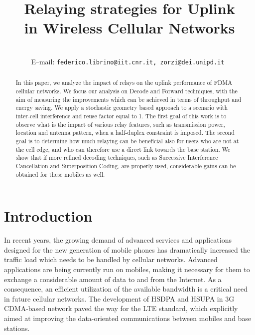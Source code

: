 \documentclass[12pt, letterpaper, onecolumn, draftcls]{IEEEtran}
\begin{document}
\sloppy
\title{Relaying strategies for Uplink\\ in Wireless Cellular Networks}


\author{\\
E--mail: \texttt{federico.librino@iit.cnr.it, zorzi@dei.unipd.it \vspace{-2mm}}
}

\date{}
\maketitle




\begin{abstract}
In this paper, we analyze the impact of relays on the uplink performance of FDMA cellular networks. We focus our analysis on Decode and Forward techniques, with the aim of measuring the improvements which can be achieved in terms of throughput and energy saving. We apply a stochastic geometry based approach to a scenario with inter-cell interference and reuse factor equal to 1.
The first goal of this work is to observe what is the impact of various relay features, such as transmission power, location and antenna pattern, when a half-duplex constraint is imposed.
The second goal is to determine how much relaying can be beneficial also for users who are not at the cell edge, and who can therefore use a direct link towards the base station. We show that if more refined decoding techniques, such as Successive Interference Cancellation and Superposition Coding, are properly used, considerable gains can be obtained for these mobiles as well.
\end{abstract}

\section{Introduction}
In recent years, the growing demand of advanced services and applications designed for the new generation of mobile phones has dramatically increased the traffic load which needs to be handled by cellular networks. Advanced applications are being currently run on mobiles, making it necessary for them to exchange a considerable amount of data to and from the Internet.
As a consequence, an efficient utilization of the available bandwidth is a critical need in future cellular networks. The development of HSDPA and HSUPA in 3G CDMA-based network paved the way for the LTE standard, which explicitly aimed at improving the data-oriented communications between mobiles and base stations.
\end{document}
